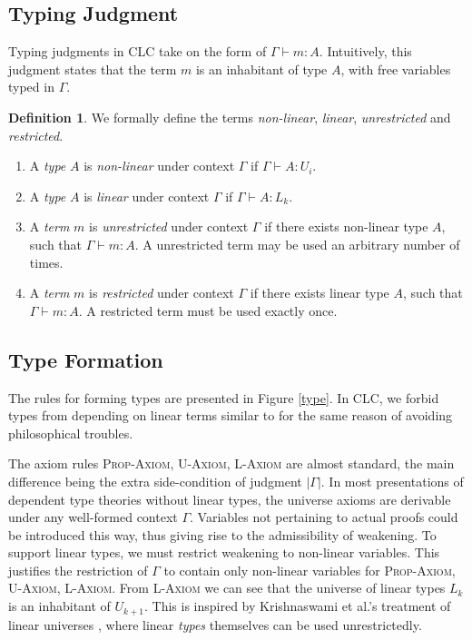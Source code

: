\documentclass[sigplan,screen]{acmart}
\theoremstyle{definition}
\newtheorem{definition}{Definition}[section]
\newcommand{\rname}[1]{\textsc{\footnotesize #1}}
\newcommand{\pure}[1]{|#1|}
\begin{document}
  \subsection{Typing Judgment}
  Typing judgments in CLC take on the form of $\Gamma \vdash m : A$. Intuitively, this judgment states that the term $m$ is an inhabitant of type $A$, with free variables typed in $\Gamma$.

  \begin{definition} We formally define the terms \textit{non-linear}, \textit{linear}, \textit{unrestricted} and \textit{restricted}.
    \begin{enumerate}
      \item A \textit{type} $A$ is \textit{non-linear} under context $\Gamma$ if $\Gamma \vdash A : U_i$.
      \item A \textit{type} $A$ is \textit{linear} under context $\Gamma$ if $\Gamma \vdash A : L_k$.
      \item A \textit{term} $m$ is \textit{unrestricted} under context $\Gamma$ if there exists non-linear type $A$, such that $\Gamma \vdash m : A$. A unrestricted term may be used an arbitrary number of times.
      \item A \textit{term} $m$ is \textit{restricted} under context $\Gamma$ if there exists linear type $A$, such that $\Gamma \vdash m : A$. A restricted term must be used exactly once.
    \end{enumerate}
  \end{definition}

  \subsection{Type Formation} \label{tyformation}
  The rules for forming types are presented in Figure \ref{type}. In CLC, we forbid types from depending on linear terms similar to \cite{llf,neel15} for the same reason of avoiding philosophical troubles.

  The axiom rules \rname{Prop-Axiom}, \rname{U-Axiom}, \rname{L-Axiom} are almost standard, the main difference being the extra side-condition of judgment $\pure{\Gamma}$. In most presentations of dependent type theories without linear types, the universe axioms are derivable under any well-formed context $\Gamma$. Variables not pertaining to actual proofs could be introduced this way, thus giving rise to the admissibility of weakening. To support linear types, we must restrict weakening to non-linear variables. This justifies the restriction of $\Gamma$ to contain only non-linear variables for \rname{Prop-Axiom}, \rname{U-Axiom}, \rname{L-Axiom}. From \rname{L-Axiom} we can see that the universe of linear types $L_k$ is an inhabitant of $U_{k+1}$. This is inspired by Krishnaswami et al.'s treatment of linear universes \cite{neel15}, where linear \textit{types} themselves can be used unrestrictedly.
\end{document}
